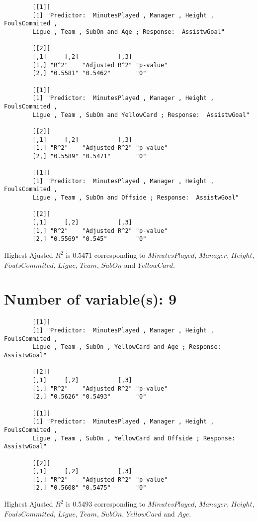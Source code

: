 \documentclass[12pt]{article}
\begin{document}
	\begin{verbatim}
		[[1]]
		[1] "Predictor:  MinutesPlayed , Manager , Height , FoulsCommited , 
		Ligue , Team , SubOn and Age ; Response:  AssistwGoal"
		
		[[2]]
		[,1]     [,2]           [,3]     
		[1,] "R^2"    "Adjusted R^2" "p-value"
		[2,] "0.5581" "0.5462"       "0"      
		
		[[1]]
		[1] "Predictor:  MinutesPlayed , Manager , Height , FoulsCommited , 
		Ligue , Team , SubOn and YellowCard ; Response:  AssistwGoal"
		
		[[2]]
		[,1]     [,2]           [,3]     
		[1,] "R^2"    "Adjusted R^2" "p-value"
		[2,] "0.5589" "0.5471"       "0"      
		
		[[1]]
		[1] "Predictor:  MinutesPlayed , Manager , Height , FoulsCommited , 
		Ligue , Team , SubOn and Offside ; Response:  AssistwGoal"
		
		[[2]]
		[,1]     [,2]           [,3]     
		[1,] "R^2"    "Adjusted R^2" "p-value"
		[2,] "0.5569" "0.545"        "0"  
	\end{verbatim}
	
	Highest Ajusted $ R^2 $ is 0.5471 corresponding to $ MinutesPlayed $, $ Manager $, $ Height $, $ FoulsCommited $, $ Ligue $, $ Team $, $ SubOn $ and $ YellowCard $.
	
	\section{Number of variable(s): 9}
	\begin{verbatim}
		[[1]]
		[1] "Predictor:  MinutesPlayed , Manager , Height , FoulsCommited , 
		Ligue , Team , SubOn , YellowCard and Age ; Response:  AssistwGoal"
		
		[[2]]
		[,1]     [,2]           [,3]     
		[1,] "R^2"    "Adjusted R^2" "p-value"
		[2,] "0.5626" "0.5493"       "0"      
		
		[[1]]
		[1] "Predictor:  MinutesPlayed , Manager , Height , FoulsCommited , 
		Ligue , Team , SubOn , YellowCard and Offside ; Response:  AssistwGoal"
		
		[[2]]
		[,1]     [,2]           [,3]     
		[1,] "R^2"    "Adjusted R^2" "p-value"
		[2,] "0.5608" "0.5475"       "0"      
	\end{verbatim}
	
	Highest Ajusted $ R^2 $ is 0.5493 corresponding to $ MinutesPlayed $, $ Manager $, $ Height $, $ FoulsCommited $, $ Ligue $, $ Team $, $ SubOn $, $ YellowCard $ and $ Age $.
	
\end{document}
